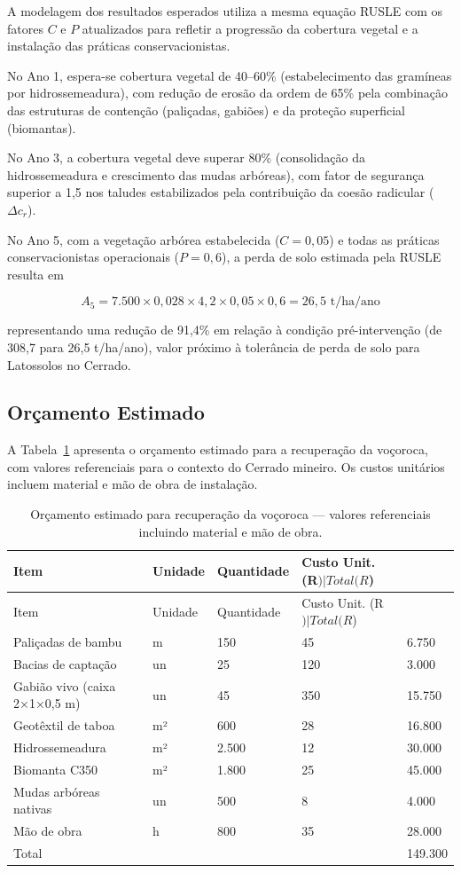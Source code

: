 \documentclass[
  portuguese,
  11pt,
  a4paper,
  open=any]{scrbook}
\begin{document}
A modelagem dos resultados esperados utiliza a mesma equação RUSLE com
os fatores \(C\) e \(P\) atualizados para refletir a progressão da
cobertura vegetal e a instalação das práticas conservacionistas.

No Ano 1, espera-se cobertura vegetal de 40--60\% (estabelecimento das
gramíneas por hidrossemeadura), com redução de erosão da ordem de 65\%
pela combinação das estruturas de contenção (paliçadas, gabiões) e da
proteção superficial (biomantas).

No Ano 3, a cobertura vegetal deve superar 80\% (consolidação da
hidrossemeadura e crescimento das mudas arbóreas), com fator de
segurança superior a 1,5 nos taludes estabilizados pela contribuição da
coesão radicular (\(\Delta c_r\)).

No Ano 5, com a vegetação arbórea estabelecida (\(C = 0{,}05\)) e todas
as práticas conservacionistas operacionais (\(P = 0{,}6\)), a perda de
solo estimada pela RUSLE resulta em

\[
A_{5} = 7.500 \times 0{,}028 \times 4{,}2 \times 0{,}05 \times 0{,}6 = 26{,}5 \text{ t/ha/ano}
\]

representando uma redução de 91,4\% em relação à condição
pré-intervenção (de 308,7 para 26,5 t/ha/ano), valor próximo à
tolerância de perda de solo para Latossolos no Cerrado.

\subsection{Orçamento Estimado}\label{oruxe7amento-estimado}

A Tabela~\ref{tbl-orcamento} apresenta o orçamento estimado para a
recuperação da voçoroca, com valores referenciais para o contexto do
Cerrado mineiro. Os custos unitários incluem material e mão de obra de
instalação.

\begin{longtable}[]{@{}lllll@{}}
\caption{Orçamento estimado para recuperação da voçoroca --- valores
referenciais incluindo material e mão de
obra.}\label{tbl-orcamento}\tabularnewline
\toprule\noalign{}
Item & Unidade & Quantidade & Custo Unit. (R\() | Total (R\)) & \\
\midrule\noalign{}
\endfirsthead
\toprule\noalign{}
Item & Unidade & Quantidade & Custo Unit. (R\() | Total (R\)) & \\
\midrule\noalign{}
\endhead
\bottomrule\noalign{}
\endlastfoot
Paliçadas de bambu & m & 150 & 45 & 6.750 \\
Bacias de captação & un & 25 & 120 & 3.000 \\
Gabião vivo (caixa 2×1×0,5 m) & un & 45 & 350 & 15.750 \\
Geotêxtil de taboa & m² & 600 & 28 & 16.800 \\
Hidrossemeadura & m² & 2.500 & 12 & 30.000 \\
Biomanta C350 & m² & 1.800 & 25 & 45.000 \\
Mudas arbóreas nativas & un & 500 & 8 & 4.000 \\
Mão de obra & h & 800 & 35 & 28.000 \\
Total & & & & 149.300 \\
\end{longtable}
\end{document}
